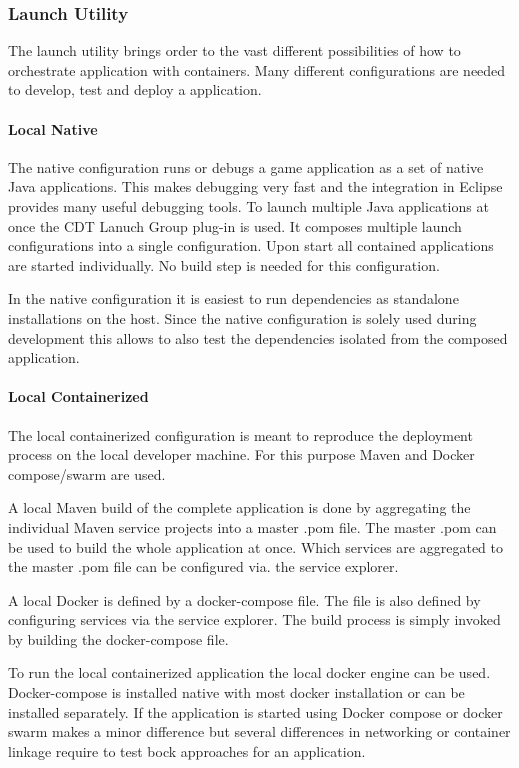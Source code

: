 \subsubsection{Launch Utility}

The launch utility brings order to the vast different possibilities of how to
orchestrate \ms{} application with containers. Many different configurations are
needed to develop, test and deploy a \ms{} application.

\paragraph{Local Native}

The native configuration runs or debugs a game application as a set of native
Java applications. This makes debugging very fast and the integration in Eclipse
provides many useful debugging tools. To launch multiple Java applications at
once the CDT Lanuch Group plug-in is used. It composes multiple launch
configurations into a single configuration. Upon start all contained
applications are started individually. No build step is needed for this
configuration.

In the native configuration it is easiest to run dependencies as standalone
installations on the host. Since the native configuration is solely used during
development this allows to also test the dependencies isolated from the composed
application.

\paragraph{Local Containerized}

The local containerized configuration is meant to reproduce the deployment
process on the local developer machine. For this purpose Maven and Docker
compose/swarm are used. 

A local Maven build of the complete application is done by aggregating the
individual Maven service projects into a master .pom file. The master .pom can
be used to build the whole application at once. Which services are aggregated to
the master .pom file can be configured via. the service explorer.

A local Docker is defined by a docker-compose file. The file is also defined by
configuring services via the service explorer. The build process is simply
invoked by building the docker-compose file.

To run the local containerized application the local docker engine can be used.
Docker-compose is installed native with most docker installation or can be
installed separately. If the application is started using Docker compose or
docker swarm makes a minor difference but several differences in networking or
container linkage require to test bock approaches for an application.

